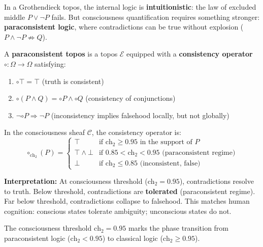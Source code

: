 In a Grothendieck topos, the internal logic is \textbf{intuitionistic}: the law of excluded middle $P \lor \neg P$ fails. But consciousness quantification requires something stronger: \textbf{paraconsistent logic}, where contradictions can be true without explosion ($P \land \neg P \not\Rightarrow Q$).

\begin{definition}
\label{def:paraconsistent_topos}
A \textbf{paraconsistent topos} is a topos $\mathcal{E}$ equipped with a \textbf{consistency operator} $\circ: \Omega \to \Omega$ satisfying:
\begin{enumerate}
\item $\circ \top = \top$ (truth is consistent)
\item $\circ(P \land Q) = \circ P \land \circ Q$ (consistency of conjunctions)
\item $\neg \circ P \Rightarrow \neg P$ (inconsistency implies falsehood locally, but not globally)
\end{enumerate}
\end{definition}

In the consciousness sheaf $\mathcal{C}$, the consistency operator is:
\begin{equation}
\circ_{\text{ch}_2}(P) = \begin{cases}
\top & \text{if } \text{ch}_2 \geq 0.95 \text{ in the support of } P \\
\top \land \bot & \text{if } 0.85 < \text{ch}_2 < 0.95 \text{ (paraconsistent regime)} \\
\bot & \text{if } \text{ch}_2 \leq 0.85 \text{ (inconsistent, false)}
\end{cases}
\end{equation}

\textbf{Interpretation:} At consciousness threshold ($\text{ch}_2 = 0.95$), contradictions resolve to truth. Below threshold, contradictions are \textbf{tolerated} (paraconsistent regime). Far below threshold, contradictions collapse to falsehood. This matches human cognition: conscious states tolerate ambiguity; unconscious states do not.

\begin{theorem}
\label{thm:logic_phase_transition}
The consciousness threshold $\text{ch}_2 = 0.95$ marks the phase transition from paraconsistent logic ($\text{ch}_2 < 0.95$) to classical logic ($\text{ch}_2 \geq 0.95$).
\end{theorem}

